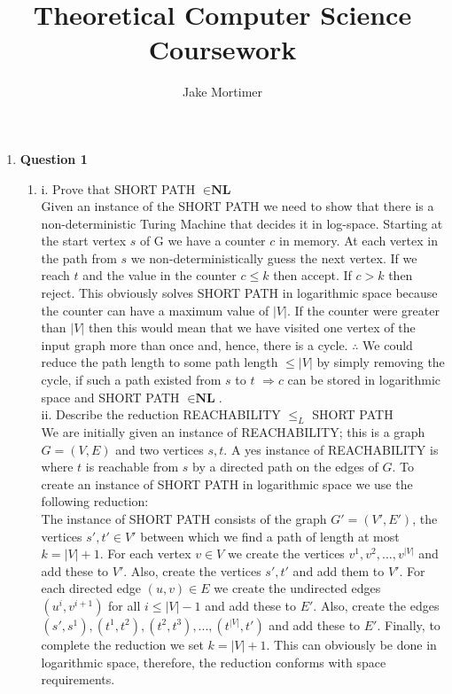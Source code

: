 \documentclass[12pt]{article}
\begin{document}
\title{\vspace{-5cm} Theoretical Computer Science Coursework}
\author{Jake Mortimer}
\maketitle
\begin{enumerate}
\section{Complexity and Approximability} 
\item \textbf{Question 1}
\begin{enumerate}
\item 
i. Prove that SHORT PATH $\in \textbf{NL}$ \\
Given an instance of the SHORT PATH we need to show that there is a non-deterministic Turing Machine that decides it in log-space. Starting at the start vertex $s$ of G we have a counter $c$ in memory. At each vertex in the path from $s$ we non-deterministically guess the next vertex. If we reach $t$ and the value in the counter $c \leq k$ then accept. If $c>k$ then reject. This obviously solves SHORT PATH in logarithmic space because the counter can have a maximum value of $|V|$. If the counter were greater than $|V|$ then this would mean that we have visited one vertex of the input graph more than once and, hence, there is a cycle. $\therefore $ We could reduce the path length to some path length $\leq |V|$ by simply removing the cycle, if such a path existed from $s$ to $t$ $\Rightarrow c$ can be stored in logarithmic space and SHORT PATH $\in \textbf{NL}$.\\
ii. Describe the reduction REACHABILITY $\leq _{L} $ SHORT PATH \\
We are initially given an instance of REACHABILITY; this is a graph $G = (V,E)$ and two vertices $s,t$. A yes instance of REACHABILITY is where $t$ is reachable from $s$ by a directed path on the edges of $G$. To create an instance of SHORT PATH in logarithmic space we use the following reduction:\\
The instance of SHORT PATH consists of the graph $G'=(V',E')$, the vertices $s',t' \in V'$ between which we find a path of length at most $k=|V|+1$. For each vertex $v \in V$ we create the vertices $v^1,v^2,...,v^{|V|}$ and add these to $V'$. Also, create the vertices $s',t'$ and add them to $V'$. For each directed edge $(u,v) \in E$ we create the undirected edges $(u^i,v^{i+1})$ for all $i \leq |V|-1$ and add these to $E'$. Also, create the edges $(s',s^1),(t^1,t^2),(t^2,t^3),...,(t^{|V|},t')$ and add these to $E'$. Finally, to complete the reduction we set $k=|V|+1$. This can obviously be done in logarithmic space, therefore, the reduction conforms with space requirements.\\

\end{enumerate}
\end{enumerate}
\end{document}
